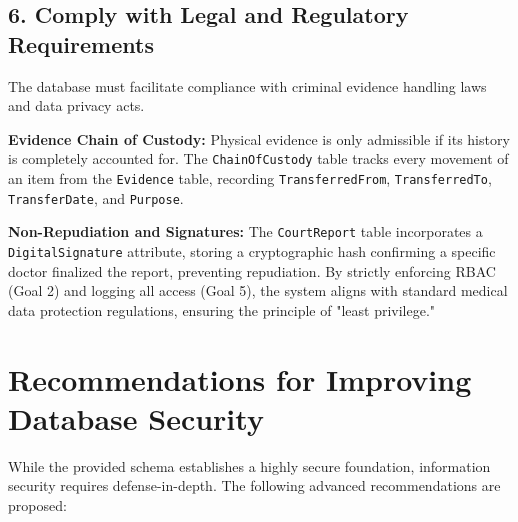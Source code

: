 \documentclass[12pt,a4paper]{article}
\begin{document}
\subsection{6. Comply with Legal and Regulatory Requirements}
The database must facilitate compliance with criminal evidence handling laws and data privacy acts.

\textbf{Evidence Chain of Custody:}
Physical evidence is only admissible if its history is completely accounted for. The \texttt{ChainOfCustody} table tracks every movement of an item from the \texttt{Evidence} table, recording \texttt{TransferredFrom}, \texttt{TransferredTo}, \texttt{TransferDate}, and \texttt{Purpose}.

\textbf{Non-Repudiation and Signatures:}
The \texttt{CourtReport} table incorporates a \texttt{DigitalSignature} attribute, storing a cryptographic hash confirming a specific doctor finalized the report, preventing repudiation. By strictly enforcing RBAC (Goal 2) and logging all access (Goal 5), the system aligns with standard medical data protection regulations, ensuring the principle of "least privilege."

\section{Recommendations for Improving Database Security}
While the provided schema establishes a highly secure foundation, information security requires defense-in-depth. The following advanced recommendations are proposed:
\end{document}
